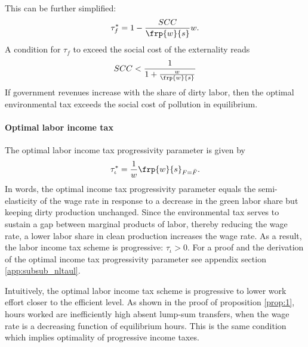 This can be further simplified:
\begin{align}
\tau_f^* = 1-\frac{SCC}{\frp{w}{s}}w. 
\end{align}
A condition for $\tau_f$ to exceed the social cost of the externality reads
\begin{align}
SCC<\frac{1}{1+\frac{w}{\frp{w}{s}}}
\end{align}
If government revenues increase with the share of dirty labor, then the optimal environmental tax exceeds the social cost of pollution in equilibrium. 	

\paragraph{Optimal labor income tax}
The optimal labor income tax progressivity parameter is given by 
\begin{align}\label{eq:nls_taulopt}
\tau_\iota^*=\frac{1}{w}\frp{w}{s}_{F=\bar{F}}.
\end{align}
In words, the optimal income tax progressivity parameter equals the semi-elasticity of the wage rate in response to a decrease in the green labor share but keeping dirty production unchanged. 
Since the environmental tax serves to sustain a gap between marginal products of labor, thereby  reducing the wage rate, a lower labor share in clean production increases the wage rate. As a result, the labor income tax scheme is progressive: $\tau_\iota>0$. For a proof and the derivation of the optimal income tax progressivity parameter see appendix section \ref{app:subsub_nltaul}.

Intuitively, the optimal labor income tax scheme is progressive to lower work effort closer to the efficient level. As shown in the proof of proposition \ref{prop:1}, hours worked are inefficiently high absent lump-sum transfers, when the wage rate is a decreasing function of equilibrium hours. This is the same condition which implies optimality of progressive income taxes. 
 
% 
 
